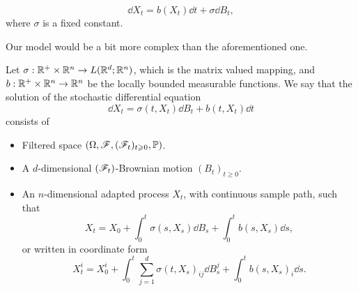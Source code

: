 \documentclass[8pt,onesided]{article}
\begin{document}
\begin{equation*}
    \dd X_t=b(X_t) \dd t+\sigma \dd B_t,
\end{equation*}
where $\sigma$ is a fixed constant.

Our model would be a bit more complex than the aforementioned one. 

\begin{definition}
 Let $ \sigma: \mathbb{R}^+ \times \mathbb{R}^n \to  L(\mathbb{R}^d;\mathbb{R}^n)$, which is the matrix valued mapping, and $b:\mathbb{R}^+ \times \mathbb{R}^n \to \mathbb{R}^n$ be the locally bounded measurable functions. We say that the solution of the stochastic differential equation
\begin{equation} 
    \dd X_t = \sigma(t,X_t) \dd B_t + b(t,X_t) \dd t
\end{equation}
consists of
\begin{itemize}
    \item Filtered space $(\Omega, \mathscr{F},(\mathscr{F}_t)_{t\geqslant 0}, \mathbb{P})$.
    \item A $d$-dimensional $(\mathscr{F}_t)$-Brownian motion $(B_t)_{t\ge0}$.
    \item An $n$-dimensional adapted process $X_t$, with continuous sample path, such that
\begin{equation*}
    \label{sde}
    X_t=X_0+\int_0^t \sigma(s,X_s)\dd B_s+\int_0^t b(s,X_s) \dd s,
\end{equation*}
or written in coordinate form
\begin{equation*}
    X_t^i=X_0^i+\int_0^t \sum_{j=1}^d \sigma(t,X_s)_{ij}\dd B_s^j+\int_0^t b(s,X_s)_i \dd s.
\end{equation*}
\end{itemize}
\end{definition}
\end{document}
